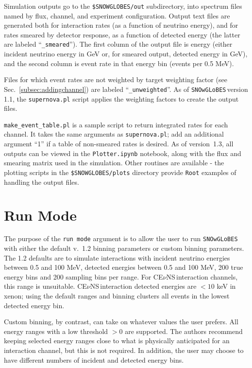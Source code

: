 \documentclass{article}
\newcommand{\cev}{CE$\nu$NS\,}
\newcommand{\snow}{\texttt{SNOwGLoBES}\,}
\begin{document}
Simulation outputs go to the \texttt{\$SNOWGLOBES/out} subdirectory, into spectrum files
named by flux, channel, and experiment configuration. Output text files are generated both for interaction rates (as a function of neutrino energy), and for rates smeared by detector response, as a function of detected energy (the latter are labeled ``\texttt{\_smeared}''). The first column of the output file is energy (either incident neutrino energy in GeV or, for smeared output, detected energy in GeV), and the second column is event rate in that energy bin (events per 0.5 MeV).

Files for which event rates are not weighted by target weighting factor (see Sec.~\ref{subsec:addingchannel}) are labeled ``\texttt{\_unweighted}''. As of \snow version 1.1, the \texttt{supernova.pl} script applies the weighting factors to create the output files.

\texttt{make\_event\_table.pl} is a sample script to return integrated rates for each channel.   It takes the same arguments as \texttt{supernova.pl}; add an additional argument ``1'' if a table of non-smeared rates is desired. As of version~1.3, all outputs can be viewed in the \texttt{Plotter.ipynb} notebook, along with the flux and smearing matrix used in the simulation. Other routines are available - the plotting scripts in the \texttt{\$SNOWGLOBES/plots} directory provide \texttt{Root} examples of handling the output files.

\section{Run Mode}\label{sec:run.mode}

The purpose of the \texttt{run mode} argument is to allow the user to run \snow with either the default v.~1.2 binning parameters or custom binning parameters. The 1.2 defaults are to simulate interactions with incident neutrino energies between 0.5 and 100 MeV, detected energies between 0.5 and 100 MeV, 200 true energy bins and 200 sampling bins per range. For \cev interaction channels, this range is unsuitable. \cev interaction detected energies are $< 10$ keV in xenon; using the default ranges and binning clusters all events in the lowest detected energy bin.

Custom binning, by contrast, can take on whatever values the user prefers. All energy ranges with a low threshold $> 0$ are supported. The authors recommend keeping selected energy ranges close to what is physically anticipated for an interaction channel, but this is not required. In addition, the user may choose to have different numbers of incident and detected energy bins.
\end{document}
